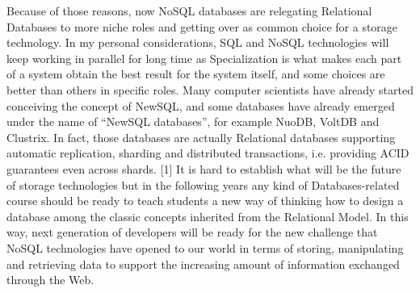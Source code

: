 Because of those reasons, now NoSQL databases are relegating Relational Databases to more niche roles and getting over as common choice for a storage technology.
In my personal considerations, SQL and NoSQL technologies will keep working in parallel for long time as Specialization is what makes each part of a system obtain the best result for the system itself, and some choices are better than others in specific roles.
Many computer scientists have already started conceiving the concept of NewSQL, and some databases have already emerged under the name of “NewSQL databases”, for example NuoDB, VoltDB and Clustrix.
In fact, those databases are actually Relational databases supporting automatic replication, sharding and distributed transactions, i.e. providing ACID guarantees even across shards. [1]
It is hard to establish what will be the future of storage technologies but in the following years any kind of Databases-related course should be ready to teach students a new way of thinking how to design a database among the classic concepts inherited from the Relational Model.
In this way, next generation of developers will be ready for the new challenge  that NoSQL technologies have opened to our world in terms of storing, manipulating and retrieving data to support the increasing amount of information exchanged through the Web.
